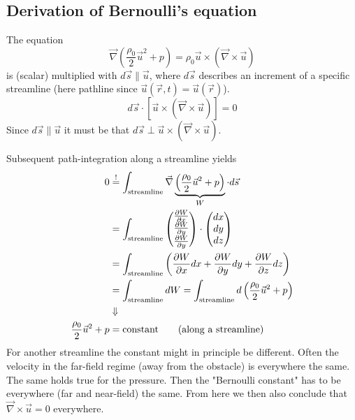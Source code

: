 \subsection{Derivation of Bernoulli's equation}
The equation
\begin{equation}
\vec{\nabla}\left(\frac{\rho_0}{2}\vec{u}^2+p\right) = \rho_0\vec{u}\times\left(\vec{\nabla}\times\vec{u}\right)
\end{equation}
is (scalar) multiplied with $d\vec{s}\parallel\vec{u}$, where $d\vec{s}$ describes an increment of a specific streamline (here pathline since $\vec{u}(\vec{r},t) = \vec{u}(\vec{r})$).
\begin{equation}
d\vec{s}\cdot\left[\vec{u}\times\left(\vec{\nabla}\times\vec{u}\right)\right]=0
\end{equation}
Since $d\vec{s}\parallel\vec{u}$ it must be that $d\vec{s}\perp\vec{u}\times\left(\vec{\nabla}\times\vec{u}\right)$.

Subsequent path-integration along a streamline yields
\begin{align}
0 &\overset{!}{=} \int_\text{streamline}\vec{\nabla}\underbrace{\left(\frac{\rho_0}{2}\vec{u}^2+p\right)}_W\cdot d\vec{s}\\
&= \int_\text{streamline} \begin{pmatrix}
\frac{\partial W}{\partial x}\\
\frac{\partial W}{\partial y}\\
\frac{\partial W}{\partial y}
\end{pmatrix}\cdot
\begin{pmatrix}
dx\\dy\\dz
\end{pmatrix}\\
&= \int_\text{streamline} \left(\frac{\partial W}{\partial x}dx+\frac{\partial W}{\partial y}dy+\frac{\partial W}{\partial z}dz\right)\\
&= \int_\text{streamline}dW = \int_\text{streamline} d\left(\frac{\rho_0}{2}\vec{u}^2+p\right)\\
&\Downarrow\notag\\
\frac{\rho_0}{2}\vec{u}^2+p&=\text{constant}\qquad\text{(along a streamline)}
\end{align}
For another streamline the constant might in principle be different. Often the velocity in the far-field regime (away from the obstacle) is everywhere the same. The same holds true for the pressure. Then the "Bernoulli constant" has to be everywhere (far and near-field) the same. From here we then also conclude that $\vec{\nabla}\times\vec{u}=0$ everywhere.

